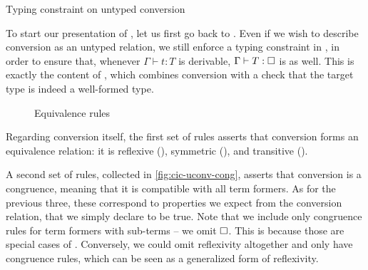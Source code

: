 \begin{marginfigure}
  \ContinuedFloat*
  \begin{mathpar}
    \label{rule:cic-conv-unty}
  \end{mathpar}
  \caption{Typing constraint on untyped conversion}
\end{marginfigure}

To start our presentation of ,
let us first go back to .
Even if we wish to describe conversion as
an untyped relation, we still enforce a typing constraint in ,
in order to ensure that, whenever $\Gamma \vdash t : T$ is derivable,
$\Gamma \vdash T : \uni$ is as well.
This is exactly the content of , which combines conversion
with a check that the target type is indeed a well-formed type.

\begin{figure}[h]
  \ContinuedFloat
  \caption{Equivalence rules}
  \label{fig:cic-uconv-equiv}
\end{figure}

Regarding conversion itself, the first set of rules asserts
that conversion forms an equivalence relation: it
is reflexive (), symmetric (),
and transitive ().

A second set of rules, collected in \cref{fig:cic-uconv-cong},
asserts that conversion is a congruence, meaning that it is compatible
with all term formers. As for the previous three, these correspond to properties we expect
from the conversion relation, that we simply declare to be true. Note that we include only
congruence rules for term formers with sub-terms – we \eg omit $\uni$. This is because
those are special cases of . Conversely, we could omit 
reflexivity altogether and only have congruence rules, which can be seen as a generalized
form of reflexivity.

